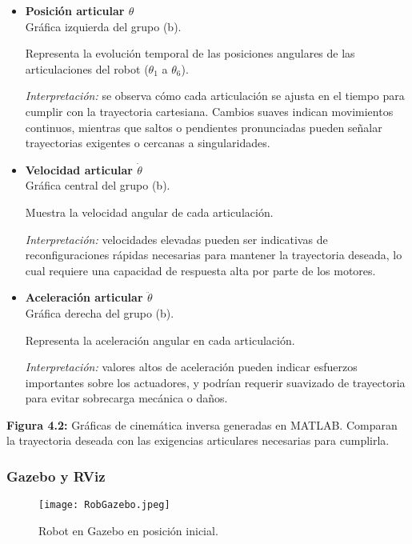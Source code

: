\begin{itemize}
	\item \textbf{Posición articular $\theta$}\\
	Gráfica izquierda del grupo (b).
	
	Representa la evolución temporal de las posiciones angulares de las articulaciones del robot ($\theta_1$ a $\theta_6$).
	
	\textit{Interpretación:} se observa cómo cada articulación se ajusta en el tiempo para cumplir con la trayectoria cartesiana. Cambios suaves indican movimientos continuos, mientras que saltos o pendientes pronunciadas pueden señalar trayectorias exigentes o cercanas a singularidades.
	
	\item \textbf{Velocidad articular $\dot{\theta}$}\\
	Gráfica central del grupo (b).
	
	Muestra la velocidad angular de cada articulación.
	
	\textit{Interpretación:} velocidades elevadas pueden ser indicativas de reconfiguraciones rápidas necesarias para mantener la trayectoria deseada, lo cual requiere una capacidad de respuesta alta por parte de los motores.
	
	\item \textbf{Aceleración articular $\ddot{\theta}$}\\
	Gráfica derecha del grupo (b).
	
	Representa la aceleración angular en cada articulación.
	
	\textit{Interpretación:} valores altos de aceleración pueden indicar esfuerzos importantes sobre los actuadores, y podrían requerir suavizado de trayectoria para evitar sobrecarga mecánica o daños.
	
\end{itemize}

\vspace{1em}

\noindent \textbf{Figura 4.2:} Gráficas de cinemática inversa generadas en MATLAB. Comparan la trayectoria deseada con las exigencias articulares necesarias para cumplirla.


\subsubsection{Gazebo y RViz}
\begin{figure}[H] 
	\centering
	\texttt{[image: RobGazebo.jpeg]}
	\caption{Robot en Gazebo en posición inicial.}
	\label{fig:RobGazebo}
\end{figure}

